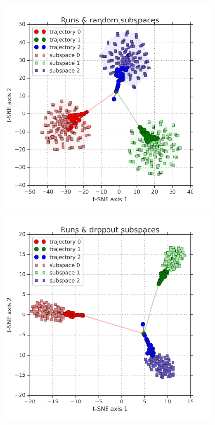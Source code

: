 \documentclass{article}
\newlength{\sfigwidth}
\newlength{\sfigwidthtsne}
\begin{document}
\begin{figure}[ht]%
    \centering%
    \includegraphics[width=\sfigwidthtsne]{figures/standalone_tsnet_runsandsubspace_random_60215.png}
    \includegraphics[width=\sfigwidthtsne]{figures/standalone_tsnet_runsandsubspace_dropout_60215.png} %

\end{figure}
\end{document}
